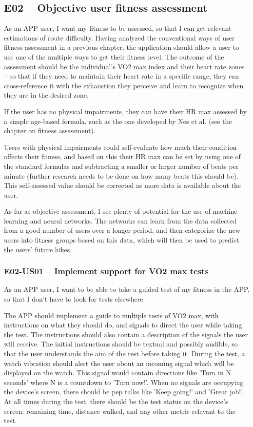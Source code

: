
\subsection*{E02 -- Objective user fitness assessment}
As an APP user, I want my fitness to be assessed, so that I can get relevant estimations of route difficulty.
Having analyzed the conventional ways of user fitness assessment in a previous chapter, the application should allow a user to use one of the multiple ways to get their fitness level.
The outcome of the assessment should be the individual's VO2 max index and their heart rate zones -- so that if they need to maintain their heart rate in a specific range, they can cross-reference it with the exhaustion they perceive and learn to recognize when they are in the desired zone.

If the user has no physical impairments, they can have their HR max assessed by a simple age-based formula, such as the one developed by Nes et al. (see the chapter on fitness assessment).

Users with physical impairments could self-evaluate how much their condition affects their fitness, and based on this their HR max can be set by using one of the standard formulas and subtracting a smaller or larger number of beats per minute (further research needs to be done on how many beats this should be).
This self-assessed value should be corrected as more data is available about the user.

As far as objective assessment, I see plenty of potential for the use of machine learning and neural networks.
The networks can learn from the data collected from a good number of users over a longer period, and then categorize the new users into fitness groups based on this data, which will then be used to predict the users' future hikes.

\subsubsection*{E02-US01 -- Implement support for VO2 max tests}
As an APP user, I want to be able to take a guided test of my fitness in the APP, so that I don't have to look for tests elsewhere.

The APP should implement a guide to multiple tests of VO2 max, with instructions on what they should do, and signals to direct the user while taking the test.
The instructions should also contain a description of the signals the user will receive.
The initial instructions should be textual and possibly audible, so that the user understands the aim of the test before taking it.
During the test, a watch vibration should alert the user about an incoming signal which will be displayed on the watch.
This signal would contain directions like 'Turn in N seconds' where N is a countdown to 'Turn now!'.
When no signals are occupying the device's screen, there should be pep talks like 'Keep going!' and 'Great job!'.
At all times during the test, there should be the test status on the device's screen: remaining time, distance walked, and any other metric relevant to the test.

